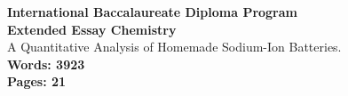 \begin{titlepage}
\begin{center}
\textbf{International Baccalaureate Diploma Program}
\vspace{10cm}\\
\Huge
\textbf{Extended Essay Chemistry}
\vspace{0.5cm}\\
\LARGE
A Quantitative Analysis of Homemade Sodium-Ion Batteries.
\vspace{8.5cm}\\
\small
\textbf{Words: 3923}\\
\textbf{Pages: 21}
\vfill
\date{\today}
\end{center}
\end{titlepage}